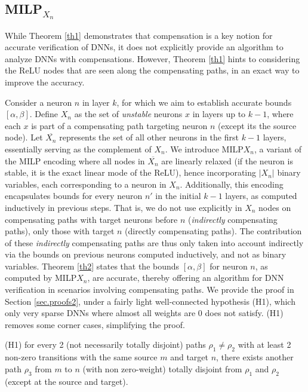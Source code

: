 \subsection{MILP$_{X_n}$}



While Theorem \ref{th1} demonstrates that compensation is a key notion for accurate verification of DNNs, it does not explicitly provide an algorithm to analyze DNNs with compensations. However, Theorem \ref{th1} hints to considering the ReLU nodes that are seen along the compensating paths, in an exact way to improve the accuracy. 

Consider a neuron $n$ in layer $k$, for which we aim to establish accurate bounds $[\alpha,\beta]$. Define $X_n$ as the set of {\em unstable} neurons $x$ in layers up to $k-1$, where each $x$ is part of a compensating path targeting neuron $n$ (except its the source node). Let $\overline{X_n}$ represents the set of all other neurons in the first $k-1$ layers, essentially serving as the complement of $X_n$. We introduce MILP${X_n}$, a variant of the MILP encoding where all nodes in $\overline{X_n}$ are linearly relaxed (if the neuron is stable, it is the exact linear mode of the ReLU), hence incorporating $|X_n|$ binary variables, each corresponding to a neuron in $X_n$. Additionally, this encoding encapsulates bounds for every neuron $n'$ in the initial $k-1$ layers, as computed inductively in previous steps. That is, we do not use explicitly in $X_n$ nodes on compensating paths with target neurons before $n$ ({\em indirectly} compensating paths), only those with target $n$ ({directly} compensating paths).
The contribution of these {\em indirectly} compensating paths are thus 
only taken into account indirectly via the bounds on previous neurons computed inductively,
and not as binary variables. Theorem \ref{th2} states that the bounds $[\alpha,\beta]$ for neuron $n$, as computed by MILP${X_n}$, are accurate, thereby offering an algorithm for DNN verification in scenarios involving compensating paths. We provide the proof in Section \ref{sec.proofs2}, under a fairly light well-connected hypothesis (H1), which only very sparse DNNs where almost all weights are 0 does not satisfy. (H1) removes some corner cases, simplifying the proof.

(H1) for every 2 (not necessarily totally disjoint) paths $\rho_1 \neq \rho_2$ with at least 2 non-zero transitions with the same source $m$ and target $n$, there exists another path $\rho_3$ from $m$ to $n$ (with non zero-weight) totally disjoint from $\rho_1$ and $\rho_2$ (except at the source and target). 


